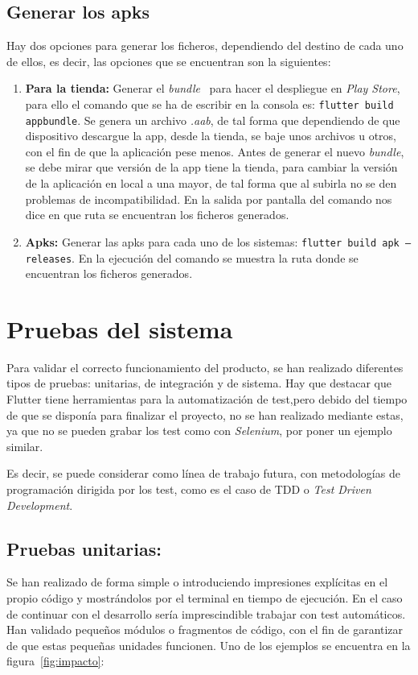 \subsection{Generar los apks}
Hay dos opciones para generar los ficheros, dependiendo del destino de cada uno de ellos, es decir, las opciones que se encuentran son la siguientes:
\begin{enumerate}
	\item \textbf{Para la tienda:} Generar el \emph{bundle}~\cite{wiki:bundle} para hacer el despliegue en \emph{Play Store}, para ello el comando que se ha de escribir en la consola es: \texttt{flutter build appbundle}. Se genera un archivo \emph{.aab}, de tal forma que dependiendo de que dispositivo descargue la app, desde la tienda, se baje unos archivos u otros, con el fin de que la aplicación pese menos.  Antes de generar el nuevo \emph{bundle}, se debe mirar que versión de la app tiene la tienda, para cambiar la versión de la aplicación en local a una mayor, de tal forma que al subirla no se den problemas de incompatibilidad. En la salida por pantalla del comando nos dice en que ruta se encuentran los ficheros generados.
	\item \textbf{Apks:} Generar las apks para cada uno de los sistemas: \texttt{flutter build apk --releases}. En la ejecución del comando se muestra la ruta donde se encuentran los ficheros generados.
\end{enumerate} 

\section{Pruebas del sistema}
Para validar el correcto funcionamiento del producto, se han realizado diferentes tipos de pruebas: unitarias, de integración y de sistema. Hay que destacar que Flutter tiene herramientas para la automatización de test,pero debido del tiempo de que se disponía para finalizar el proyecto, no se han realizado mediante estas, ya que no se pueden grabar los test como con \emph{Selenium}, por poner un ejemplo similar. 

Es decir, se puede considerar como línea de trabajo futura, con metodologías de programación dirigida por los test, como es el caso de TDD  o \emph{Test Driven Development}.

\subsection{Pruebas unitarias:}
Se han realizado de forma simple o introduciendo impresiones explícitas en el propio código y mostrándolos por el terminal en tiempo de ejecución. En el caso de continuar con el desarrollo sería imprescindible trabajar con test automáticos. Han validado pequeños módulos o fragmentos de código, con el fin de garantizar de que estas pequeñas unidades funcionen. Uno de los ejemplos se encuentra en la figura~\ref{fig:impacto}:

